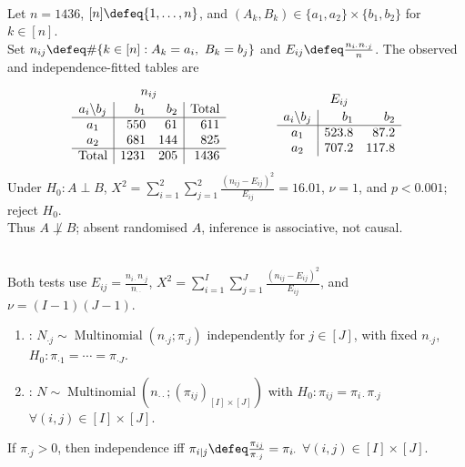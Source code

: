 \begin{example} \label{ex:education-marital-status-independence} \\
Let $n=1436$, $[n]\defeq\{1,\ldots,n\}$, and $(A_k,B_k)\in\{a_1,a_2\}\times\{b_1,b_2\}$ for $k\in[n]$.\\
Set $n_{ij}\defeq\#\{k\in[n]:A_k=a_i,\ B_k=b_j\}$ and $E_{ij}\defeq\frac{n_{i\cdot}n_{\cdot j}}{n}$. The observed and independence-fitted tables are
\[
\begin{array}{c@{\hspace{3em}}c}
\begin{array}{c}
n_{ij}\\[2pt]
\begin{array}{c|rr|r}
a_i\backslash b_j&b_1&b_2&\text{Total}\\ \hline
a_1&550&61&611\\
a_2&681&144&825\\ \hline
\text{Total}&1231&205&1436
\end{array}
\end{array}
&
\begin{array}{c}
E_{ij}\\[2pt]
\begin{array}{c|rr}
a_i\backslash b_j&b_1&b_2\\ \hline
a_1&523.8&87.2\\
a_2&707.2&117.8
\end{array}
\end{array}
\end{array}
\]
Under $H_0:A\perp B$, $X^2=\sum\limits_{i=1}^{2}\sum\limits_{j=1}^{2}\frac{(n_{ij}-E_{ij})^2}{E_{ij}}=16.01$, $\nu=1$, and $p<0.001$; reject $H_0$.\\
Thus $A\not\perp B$; absent randomised $A$, inference is associative, not causal.
\end{example}

\begin{remark} \label{rem:homogeneity-versus-independence} \\
Both tests use $E_{ij}=\frac{n_{i\cdot}n_{\cdot j}}{n_{\cdot\cdot}}$, $X^2=\sum\limits_{i=1}^{I}\sum\limits_{j=1}^{J}\frac{(n_{ij}-E_{ij})^2}{E_{ij}}$, and $\nu=(I-1)(J-1)$.
\begin{enumerate}[label=(\roman*)]
\setlength{\itemsep}{0pt}
\item {}: $N_{\cdot j}\sim\operatorname{Multinomial}(n_{\cdot j};\pi_{\cdot j})$ independently for $j\in[J]$, with fixed $n_{\cdot j}$, $H_0:\pi_{\cdot 1}=\cdots=\pi_{\cdot J}$.
\item {}: $N\sim\operatorname{Multinomial}(n_{\cdot\cdot};(\pi_{ij})_{[I]\times[J]})$ with $H_0:\pi_{ij}=\pi_{i\cdot}\pi_{\cdot j}$ $\forall(i,j)\in[I]\times[J]$.
\end{enumerate}
If $\pi_{\cdot j}>0$, then independence iff $\pi_{i\mid j}\defeq\frac{\pi_{ij}}{\pi_{\cdot j}}=\pi_{i\cdot}$ $\forall(i,j)\in[I]\times[J]$.
\end{remark}

